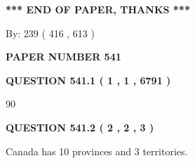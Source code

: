 \documentclass[12pt]{article}
\begin{document}
 
 
 
   
   
 \vspace{0.2in}
 
   
   
   
   
\vspace{1.0in} 
{\textbf{\large{ *** END OF PAPER, THANKS *** }}} 
   
   
\hspace{1.0in} By: 
 239 ( 416 ,  613 )
   
   
   
   
\newpage 
\setcounter{page}{ 
   541001 } 
   
   
   
   
 {\textbf{ \Large{ PAPER NUMBER  541  }}}
   
   
\vspace{0.2in}
   
   
   
   
   
   
 \vspace{0.2in}
 
 
 
 
   
   
  
\vspace{0.2in}
  
{\textbf{\Large{QUESTION
541.1 
 ( 1 , 1 , 6791 )
}}}
  
  
 
 
\noindent{}

90
 
 
  
\vspace{0.2in}
  
{\textbf{\Large{QUESTION
541.2 
 ( 2 , 2 , 3 )
}}}
  
  
 
 
\noindent{}
 
 
Canada has 10  provinces and 3 territories.
 
 
 
 
   
   
 \vspace{0.2in}
 
   
   
\end{document}
